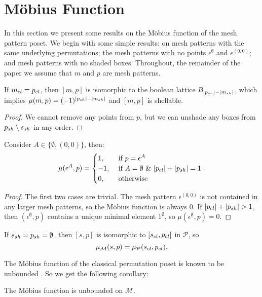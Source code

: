 \documentclass[11pt,a4paper,oneside]{article}
\begin{document}
\section{M\"obius Function}\label{sec:MF}
In this section we present some results on the M\"obius function of the mesh pattern poset.
We begin with some simple results: on mesh patterns with the same underlying permutations;
the mesh patterns with no points $\epsilon^\emptyset$ and $\epsilon^{(0,0)}$;
and mesh patterns with no shaded boxes.
Throughout, the remainder of the paper we assume that $m$ and $p$ are
mesh patterns.

\begin{lem}
If $m_{cl}=p_{cl}$, then $[m,p]$ is isomorphic to the boolean lattice
$B_{|p_{sh}|-|m_{sh}|}$, which implies $\mu(m,p)=(-1)^{|p_{sh}|-|m_{sh}|}$ and
$[m,p]$ is shellable.
\begin{proof}
We cannot remove any points from $p$, but we can
unshade any boxes from $p_{sh}\setminus s_{sh}$ in any order.
\end{proof}
\end{lem}

\begin{lem}
Consider $A\in\{\emptyset,(0,0)\}$, then:
$$\mu(\epsilon^{A},p)=\begin{cases}
1,&\mbox{ if }p=\epsilon^A \\
-1,&\mbox{ if }A=\emptyset\,\,\&\,\,|p_{cl}|+|p_{sh}|=1\\
0,&\mbox{ otherwise}
\end{cases}.$$
\begin{proof}
The first two cases are trivial. The
mesh pattern $\epsilon^{(0,0)}$ is not contained in any larger mesh patterns, so
the M\"obius function is always $0$. If $|\cl{p}|+|\sh{p}|>1$, then
$(\epsilon^\emptyset,p)$ contains a unique minimal element $1^\emptyset$, so
$\mu(\epsilon^\emptyset,p)=0$.
\end{proof}
\end{lem}

\begin{lem}
If $s_{sh}=p_{sh}=\emptyset$, then $[s,p]$ is isomorphic to
$[s_{cl},p_{cl}]$ in $\mathcal{P}$, so $$\operatorname{\mu_\mathcal{M}}(s,p)=\operatorname{\mu_\mathcal{P}}(s_{cl},p_{cl}).$$
\end{lem}

The M\"obius function of the classical permutation poset is known to be
unbounded \cite{Smith13}. So we get the following corollary:

\begin{cor}
The M\"obius function is unbounded on $\mathcal{M}$.
\end{cor}
\end{document}
